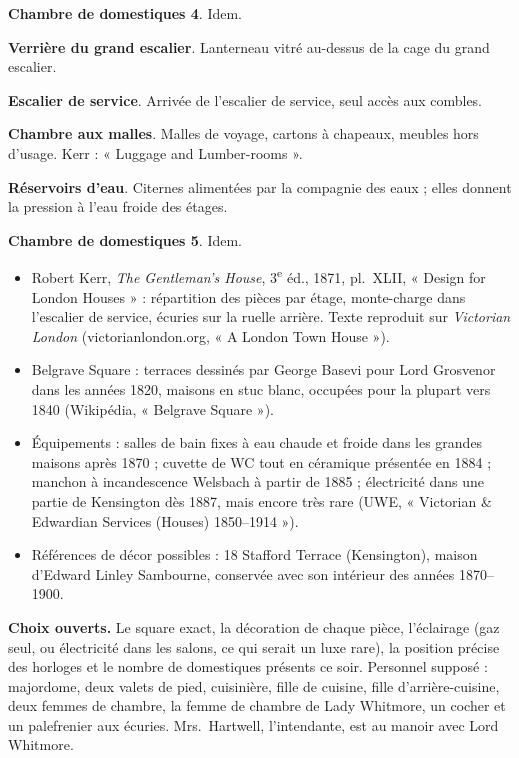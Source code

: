\documentclass[10pt,a4paper]{article}
\newcommand{\niveau}[1]{\par\noindent{\color{accent}\fontsize{17}{20}\selectfont\itshape #1}\par\vspace{2pt}}
\begin{document}
\begin{minipage}[t]{8.95cm}
\begin{descr}
\item[\textbf{C4}] \textbf{Chambre de domestiques 4}. Idem.
\item[\textbf{C6}] \textbf{Verrière du grand escalier}. Lanterneau vitré au-dessus de la cage du grand escalier.
\item[\textbf{C8}] \textbf{Escalier de service}. Arrivée de l'escalier de service, seul accès aux combles.
\item[\textbf{C10}] \textbf{Chambre aux malles}. Malles de voyage, cartons à chapeaux, meubles hors d'usage. Kerr : « Luggage and Lumber-rooms ».
\item[\textbf{C11}] \textbf{Réservoirs d'eau}. Citernes alimentées par la compagnie des eaux ; elles donnent la pression à l'eau froide des étages.
\item[\textbf{C12}] \textbf{Chambre de domestiques 5}. Idem.
\end{descr}
\end{minipage}
\newpage
\niveau{Sources et repères}
\begin{itemize}[leftmargin=1.2em,itemsep=3pt]
\item Robert Kerr, \emph{The Gentleman's House}, 3\textsuperscript{e} éd., 1871, pl.~XLII, « Design for London Houses » : répartition des pièces par étage, monte-charge dans l'escalier de service, écuries sur la ruelle arrière. Texte reproduit sur \emph{Victorian London} (victorianlondon.org, « A London Town House »).
\item Belgrave Square : terraces dessinés par George Basevi pour Lord Grosvenor dans les années 1820, maisons en stuc blanc, occupées pour la plupart vers 1840 (Wikipédia, « Belgrave Square »).
\item Équipements : salles de bain fixes à eau chaude et froide dans les grandes maisons après 1870 ; cuvette de WC tout en céramique présentée en 1884 ; manchon à incandescence Welsbach à partir de 1885 ; électricité dans une partie de Kensington dès 1887, mais encore très rare (UWE, « Victorian \& Edwardian Services (Houses) 1850--1914 »).
\item Références de décor possibles : 18 Stafford Terrace (Kensington), maison d'Edward Linley Sambourne, conservée avec son intérieur des années 1870--1900.
\end{itemize}

\textbf{Choix ouverts.} Le square exact, la décoration de chaque pièce, l'éclairage (gaz seul, ou électricité dans les salons, ce qui serait un luxe rare), la position précise des horloges et le nombre de domestiques présents ce soir. Personnel supposé : majordome, deux valets de pied, cuisinière, fille de cuisine, fille d'arrière-cuisine, deux femmes de chambre, la femme de chambre de Lady Whitmore, un cocher et un palefrenier aux écuries. Mrs.~Hartwell, l'intendante, est au manoir avec Lord Whitmore.
\end{document}
